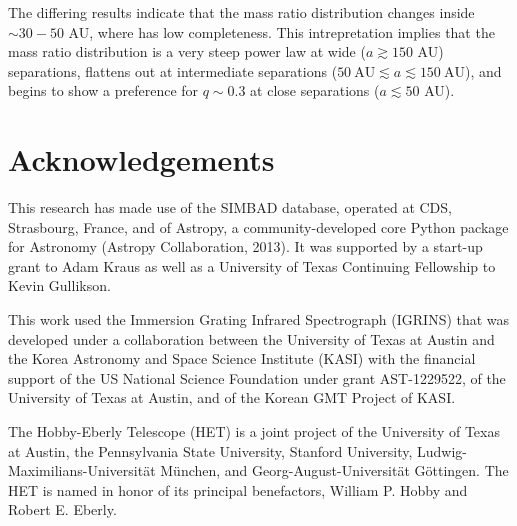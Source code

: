 \documentclass{emulateapj}
\begin{document}
The differing results indicate that the mass ratio distribution changes inside $\sim 30-50$ AU, where \citet{DeRosa2014} has low completeness. This intrepretation implies that the mass ratio distribution is a very steep power law at wide ($a \gtrsim 150$ AU) separations, flattens out at intermediate separations ($50\ \mathrm{AU} \lesssim a \lesssim 150\ \mathrm{AU}$), and begins to show a preference for $q \sim 0.3$ at close separations ($a \lesssim 50$ AU).






\section*{Acknowledgements}
This research has made use of the SIMBAD database, operated at CDS, Strasbourg, France, and of Astropy, a community-developed core Python package for Astronomy (Astropy Collaboration, 2013).
It was supported by a start-up grant to Adam Kraus as well as a University of Texas Continuing Fellowship to Kevin Gullikson.

This work used the Immersion Grating Infrared Spectrograph (IGRINS) that was developed under a collaboration between the University of Texas at Austin and the Korea Astronomy and Space Science Institute (KASI) with the financial support of the US National Science Foundation under grant AST-1229522, of the University of Texas at Austin, and of the Korean GMT Project of KASI.

The Hobby-Eberly Telescope (HET) is a joint project of the University of Texas at Austin, the Pennsylvania State University, Stanford University, Ludwig-Maximilians-Universit\"at M\"unchen, and Georg-August-Universit\"at G\"ottingen. The HET is named in honor of its principal benefactors, William P. Hobby and Robert E. Eberly.
\end{document}
